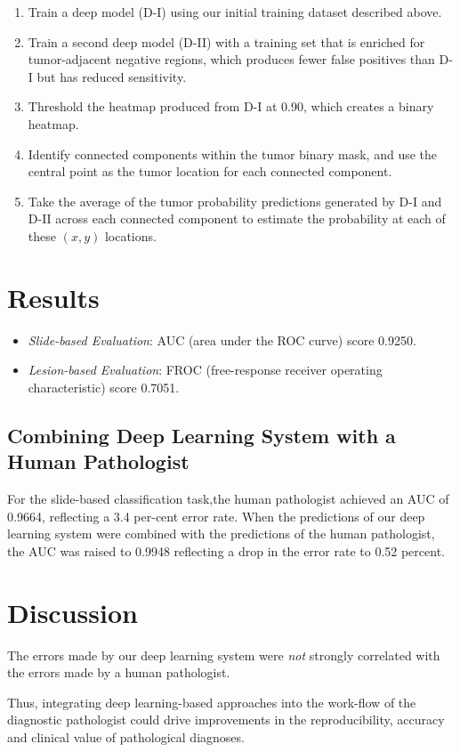 \documentclass[a4paper,12pt]{article}
\begin{document}
\begin{enumerate}
	\setlength\itemsep{0em}
	\item Train a deep model (D-I) using our initial training dataset described above.
	\item Train a second deep model (D-II) with a training set that is enriched for tumor-adjacent negative regions, which produces fewer false positives than D-I but has reduced sensitivity.
	\item Threshold the heatmap produced from D-I at 0.90, which creates a binary heatmap.
	\item Identify connected components within the tumor binary mask, and use the central point as the tumor location for each connected component.
	\item Take the average of the tumor probability predictions generated by D-I and D-II across each connected component to estimate the probability at each of these $(x, y)$ locations.
\end{enumerate}

\section{Results}

\begin{itemize}
	\setlength\itemsep{0em}
	\item \emph{Slide-based Evaluation}: AUC (area under the ROC curve) score 0.9250.
	\item \emph{Lesion-based Evaluation}: FROC (free-response receiver operating characteristic) score 0.7051.
\end{itemize}

\subsection{Combining Deep Learning System with a Human Pathologist}

For the slide-based classification task,the human pathologist achieved an AUC of 0.9664, reflecting a 3.4 per-cent error rate. When the predictions of our deep learning system were combined with the predictions of the human pathologist, the AUC was raised to 0.9948 reflecting a drop in the error rate to 0.52 percent.

\section{Discussion}

The errors made by our deep learning system were \emph{not} strongly correlated with the errors made by a human pathologist.

Thus, integrating deep learning-based approaches into the work-flow of the diagnostic pathologist could drive improvements in the reproducibility, accuracy and clinical value of pathological diagnoses.
\end{document}
